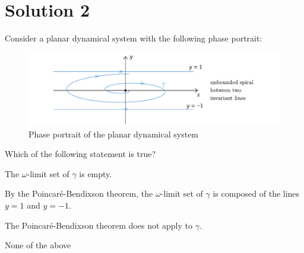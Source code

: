 \documentclass[twoside,10pt,a4paper]{article}
\begin{document}
\newpage

\section*{Solution 2}
Consider a planar dynamical system with the following phase portrait:

\begin{figure}[H]
	\centering
	\includegraphics[scale=0.9]{Graphics/MCQ2_figures/Q04D01.pdf}
	\caption{Phase portrait of the planar dynamical system}
\end{figure}

Which of the following statement is true?

\begin{enumerate}[label=(\alph*)]
	\item The $\omega$-limit set of $\gamma$ is empty.
	\item By the Poincaré-Bendixson theorem, the $\omega$-limit set of $\gamma$ is composed of the lines $y = 1$ and $y = -1$.
	{\color{MyRed}\item The Poincaré-Bendixson theorem does not apply to $\gamma$.}
	\item None of the above
\end{enumerate}


\newpage
\end{document}
